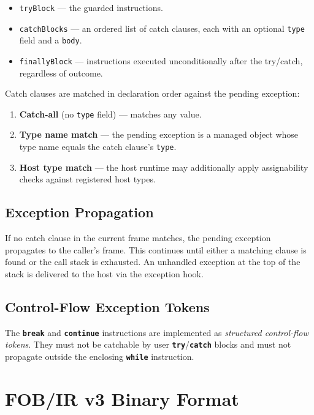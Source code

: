 \documentclass[11pt,a4paper]{article}
\newcommand{\code}[1]{\texttt{\small #1}}
\newcommand{\opcode}[1]{\textbf{\texttt{#1}}}
\begin{document}
\begin{itemize}[leftmargin=1.8em]
  \item \code{tryBlock} --- the guarded instructions.
  \item \code{catchBlocks} --- an ordered list of catch clauses, each with
    an optional \code{type} field and a \code{body}.
  \item \code{finallyBlock} --- instructions executed unconditionally after
    the try/catch, regardless of outcome.
\end{itemize}

Catch clauses are matched in declaration order against the pending exception:

\begin{enumerate}[leftmargin=2em]
  \item \textbf{Catch-all} (no \code{type} field) --- matches any value.
  \item \textbf{Type name match} --- the pending exception is a managed object
    whose type name equals the catch clause's \code{type}.
  \item \textbf{Host type match} --- the host runtime may additionally apply
    assignability checks against registered host types.
\end{enumerate}

\subsection{Exception Propagation}

If no catch clause in the current frame matches, the pending exception
propagates to the caller's frame. This continues until either a matching
clause is found or the call stack is exhausted. An unhandled exception at
the top of the stack is delivered to the host via the exception hook.

\subsection{Control-Flow Exception Tokens}

The \opcode{break} and \opcode{continue} instructions are implemented as
\emph{structured control-flow tokens}. They must not be catchable by user
\opcode{try}/\opcode{catch} blocks and must not propagate outside the
enclosing \opcode{while} instruction.

\section{FOB/IR v3 Binary Format}
\label{sec:fob}
\end{document}
